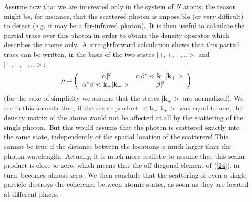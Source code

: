 \documentclass[12pt,onecolumn]{article}%
\begin{document}
Assume now that we are interested only in the system of $N$ atoms; the reason
might be, for instance, that the scattered photon is impossible (or very
difficult) to detect (e.g. it may be a far-infrared photon).\ It is then
useful to calculate the partial trace over this photon in order to obtain the
density operator which describes the atoms only.\ A straightforward
calculation shows that this partial trace can be written, in the basis of the
two states $|+,+,+,..>$ and $|-,-,-,..>:$%
\begin{equation}
\rho=\left(
\begin{array}
[c]{cc}%
|\alpha|^{2} & \alpha\beta^{\ast}<\mathbf{k}_{-}|\mathbf{k}_{+}>\\
\alpha^{\ast}\beta<\mathbf{k}_{+}|\mathbf{k}_{-}> & |\beta|^{2}%
\end{array}
\right)  \label{24}%
\end{equation}
(for the sake of simplicity we assume that the states $|\mathbf{k}_{\pm}>$
are normalized). We see in this formula that, if the scalar product
$<\mathbf{k}_{-}|\mathbf{k}_{+}>$ was equal to one, the density matrix of
the atoms would not be affected at all by the scattering of the single
photon.\ But this would assume that the photon is scattered exactly into the
same state, independently of the spatial location of the scatterers! This
cannot be true if the distance between the locations is much larger than the
photon wavelength.\ Actually, it is much more realistic to assume that this
scalar product is close to zero, which means that the off-diagonal element of
(\ref{24}), in turn, becomes almost zero.\ We then conclude that the
scattering of even a single particle destroys the coherence between atomic
states, as soon as they are located at different places.
\end{document}
